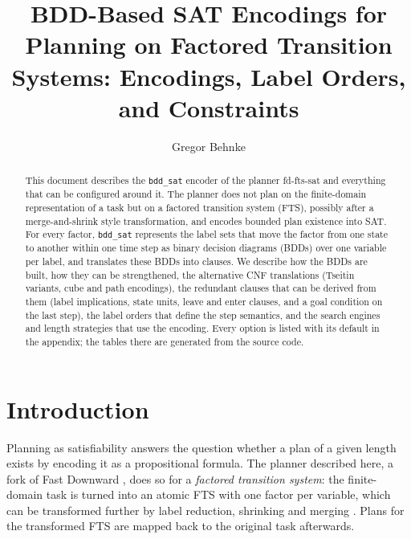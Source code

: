 \documentclass[manuscript, screen]{jair}
\newcommand{\opt}[1]{\texttt{#1}}
\newcommand{\bddsat}{\opt{bdd\_sat}\xspace}
\begin{document}
\title[BDD-Based SAT Encodings for Factored Transition Systems]{BDD-Based SAT Encodings for
Planning on Factored Transition Systems: Encodings, Label Orders, and Constraints}

\author{Gregor Behnke}

\renewcommand{\shortauthors}{Behnke}

\begin{abstract}
  This document describes the \bddsat encoder of the planner fd-fts-sat and everything that can be
  configured around it. The planner does not plan on the finite-domain representation of a task but
  on a factored transition system (FTS), possibly after a merge-and-shrink style transformation, and
  encodes bounded plan existence into SAT. For every factor, \bddsat represents the label sets that
  move the factor from one state to another within one time step as binary decision diagrams (BDDs)
  over one variable per label, and translates these BDDs into clauses. We describe how the BDDs are
  built, how they can be strengthened, the alternative CNF translations (Tseitin variants, cube and
  path encodings), the redundant clauses that can be derived from them (label implications, state
  units, leave and enter clauses, and a goal condition on the last step), the label orders that
  define the step semantics, and the search engines and length strategies that use the encoding.
  Every option is listed with its default in the appendix; the tables there are generated from the
  source code.
\end{abstract}


\maketitle

\section{Introduction}

Planning as satisfiability \parencite{kautz-selman-ecai1992} answers the question whether a plan of
a given length exists by encoding it as a propositional formula. The planner described here, a fork
of Fast Downward \parencite{helmert-jair2006}, does so for a \emph{factored transition system}: the
finite-domain task is turned into an atomic FTS with one factor per variable, which can be
transformed further by label reduction, shrinking and merging
\parencite{sievers-helmert-jair2021,torralba-sievers-ijcai2019}. Plans for the transformed FTS are
mapped back to the original task afterwards.
\end{document}
